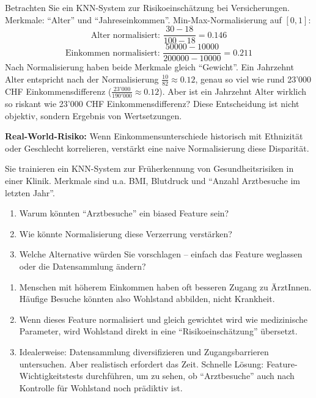 \begin{myexample}
    Betrachten Sie ein KNN-System zur Risikoeinschätzung bei Versicherungen. Merkmale: \enquote{Alter} und \enquote{Jahreseinkommen}. Min-Max-Normalisierung auf \([0,1]\):
    \[
        \text{Alter normalisiert: } \frac{30-18}{100-18} = 0.146
    \]
    \[
        \text{Einkommen normalisiert: } \frac{50000-10000}{200000-10000} = 0.211
    \]
    Nach Normalisierung haben beide Merkmale gleich \enquote{Gewicht}. Ein Jahrzehnt Alter entspricht nach der Normalisierung $\frac{10}{82} \approx 0.12$, genau so viel wie rund 23'000 CHF Einkommensdifferenz ($\frac{23'000}{190'000} \approx 0.12$). Aber ist ein Jahrzehnt Alter wirklich so riskant wie 23'000 CHF Einkommensdifferenz? Diese Entscheidung ist nicht objektiv, sondern Ergebnis von Wertsetzungen.

    \textbf{Real-World-Risiko:} Wenn Einkommensunterschiede historisch mit Ethnizität oder Geschlecht korrelieren, verstärkt eine naive Normalisierung diese Disparität.
\end{myexample}

\begin{mychallenge}
    Sie trainieren ein KNN-System zur Früherkennung von Gesundheitsrisiken in einer Klinik. Merkmale sind u.a. BMI, Blutdruck und \enquote{Anzahl Arztbesuche im letzten Jahr}.
    \begin{enumerate}
        \item Warum könnten \enquote{Arztbesuche} ein biased Feature sein?
        \item Wie könnte Normalisierung diese Verzerrung verstärken?
        \item Welche Alternative würden Sie vorschlagen -- einfach das Feature weglassen oder die Datensammlung ändern?
    \end{enumerate}
    \begin{myanswer}
        \begin{enumerate}
            \item Menschen mit höherem Einkommen haben oft besseren Zugang zu ÄrztInnen. Häufige Besuche könnten also Wohlstand abbilden, nicht Krankheit.
            \item Wenn dieses Feature normalisiert und gleich gewichtet wird wie medizinische Parameter, wird Wohlstand direkt in eine \enquote{Risikoeinschätzung} übersetzt.
            \item Idealerweise: Datensammlung diversifizieren und Zugangsbarrieren untersuchen. Aber realistisch erfordert das Zeit. Schnelle Lösung: Feature-Wichtigkeitstests durchführen, um zu sehen, ob \enquote{Arztbesuche} auch nach Kontrolle für Wohlstand noch prädiktiv ist.
        \end{enumerate}
    \end{myanswer}
\end{mychallenge}

